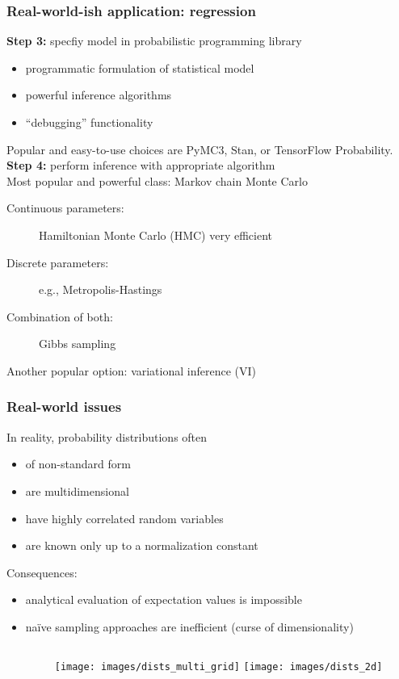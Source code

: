 \documentclass[t,aspectratio=169]{beamer}
\begin{document}
\begin{frame}
  \frametitle{Real-world-ish application: regression}
  \textbf{Step 3:} specfiy model in probabilistic programming library\\
  \begin{itemize}
  \item programmatic formulation of statistical model
  \item powerful inference algorithms
  \item ``debugging'' functionality
  \end{itemize}
  Popular and easy-to-use choices are PyMC3, Stan, or TensorFlow Probability.
  \bigskip\\
  \textbf{Step 4:} perform inference with appropriate algorithm\\
  Most popular and powerful class: Markov chain Monte Carlo
  \begin{description}
  \item[Continuous parameters:] Hamiltonian Monte Carlo (HMC) very efficient\\
  \item[Discrete parameters:] e.g., Metropolis-Hastings\\
  \item[Combination of both:] Gibbs sampling
  \end{description}
  Another popular option: variational inference (VI)
\end{frame}

\begin{frame}
  \frametitle{Real-world issues}
  In reality, probability distributions often
  \begin{itemize}
  \item of non-standard form
  \item are multidimensional
  \item have highly correlated random variables
  \item are known only up to a normalization constant
  \end{itemize}
  Consequences:
  \begin{itemize}
  \item analytical evaluation of expectation values is impossible
  \item naïve sampling approaches are inefficient (curse of dimensionality)
  \end{itemize}
  \begin{columns}
    \begin{column}{0.33\textwidth}
    \end{column}
    \begin{column}{0.63\textwidth}
      \texttt{[image: images/dists\_multi\_grid]}
      \texttt{[image: images/dists\_2d]}
      
    \end{column}
  \end{columns}
\end{frame}
\end{document}
